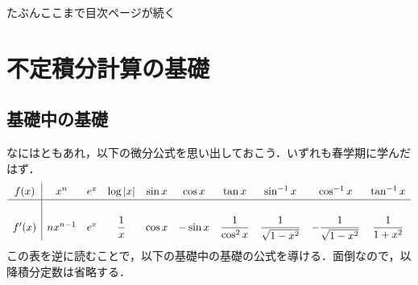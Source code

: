 \documentclass[10pt, uplatex, dvipdfmx]{jsarticle}
\theoremstyle{definition}
\numberwithin{equation}{section}
\begin{document}
\newpage

\tableofcontents

\newpage

たぶんここまで目次ページが続く



\newpage

\section{不定積分計算の基礎}

\subsection{基礎中の基礎}\label{subsec:fundamental}

なにはともあれ，以下の微分公式を思い出しておこう．いずれも春学期に学んだはず．
\[\renewcommand{\arraystretch}{1.3}
  \begin{array}[h]{c|ccccccccc}
    f(x) & x^n & e^x & \log|x| & \sin x & \cos x & \tan x & \sin^{-1}x & \cos ^{-1} x & \tan^{-1} x\\ \hline
    \\
    f'(x) & n x^{n-1} & e^x & \dfrac{1}{x} & \cos x & -\sin x & \dfrac{1}{\cos^2x} & \dfrac{1}{\sqrt{1-x^2}}
                                                                       & -\dfrac{1}{\sqrt{1-x^2}} & \dfrac{1}{1+x^2}
  \end{array}
\]
この表を逆に読むことで，以下の基礎中の基礎の公式を導ける．面倒なので，以降積分定数は省略する．

\vspace{1zh}
\end{document}
